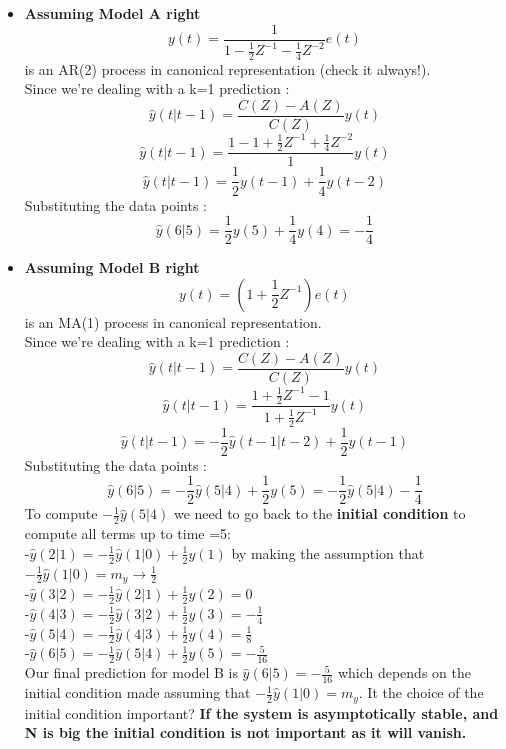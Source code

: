 \begin{itemize}
\item \textbf{Assuming Model A right}\hfill\\
$$ y(t) = \frac{1}{1-\frac{1}{2}Z^{-1}-\frac{1}{4}Z^{-2}} e(t)$$ is an AR(2) process in canonical representation (check it always!).\\
Since we're dealing with a k=1 prediction : 
$$ \hat{y}(t|t-1) = \frac{C(Z)-A(Z)}{C(Z)}y(t)$$
$$ \hat{y}(t|t-1) = \frac{1-1+\frac{1}{2}Z^{-1}+\frac{1}{4}Z^{-2}}{1}y(t)$$
$$ \hat{y}(t|t-1) = \frac{1}{2}y(t-1) + \frac{1}{4}y(t-2)$$
Substituting the data points :
$$ \hat{y}(6|5) = \frac{1}{2}y(5) + \frac{1}{4}y(4) = -\frac{1}{4}$$
\item \textbf{Assuming Model B right}\hfill\\
$$ y(t) = (1+\frac{1}{2}Z^{-1})e(t) $$ is an MA(1) process in canonical representation.\\
Since we're dealing with a k=1 prediction : 
$$ \hat{y}(t|t-1) = \frac{C(Z)-A(Z)}{C(Z)}y(t)$$
$$ \hat{y}(t|t-1) = \frac{1+\frac{1}{2}Z^{-1}-1}{1+\frac{1}{2}Z^{-1}}y(t)$$
$$ \hat{y}(t|t-1) = -\frac{1}{2}\hat{y}(t-1|t-2) +\frac{1}{2}y(t-1)$$
Substituting the data points :
$$ \hat{y}(6|5) = -\frac{1}{2}\hat{y}(5|4) + \frac{1}{2}y(5) = -\frac{1}{2}\hat{y}(5|4) -\frac{1}{4}$$
To compute $-\frac{1}{2}\hat{y}(5|4)$ we need to go back to the \textbf{initial condition } to compute all terms up to time =5:\\
-$ \hat{y}(2|1) = -\frac{1}{2}\hat{y}(1|0) + \frac{1}{2}y(1)$ by making the assumption that $-\frac{1}{2}\hat{y}(1|0) = m_y \to \frac{1}{2}$\\
-$ \hat{y}(3|2) = -\frac{1}{2}\hat{y}(2|1) + \frac{1}{2}y(2) = 0$\\
-$ \hat{y}(4|3) = -\frac{1}{2}\hat{y}(3|2) + \frac{1}{2}y(3) = -\frac{1}{4}$\\
-$ \hat{y}(5|4) = -\frac{1}{2}\hat{y}(4|3) + \frac{1}{2}y(4) = \frac{1}{8}$\\
-$ \hat{y}(6|5) = -\frac{1}{2}\hat{y}(5|4) + \frac{1}{2}y(5) = -\frac{5}{16}$\\
Our final prediction for model B is $\hat{y}(6|5) = -\frac{5}{16}$ which depends on the initial condition made assuming that $-\frac{1}{2}\hat{y}(1|0) = m_y $. It the choice of the initial condition important?
\textbf{If the system is asymptotically stable, and N is big the initial condition is not important as it will vanish.}


\end{itemize}

